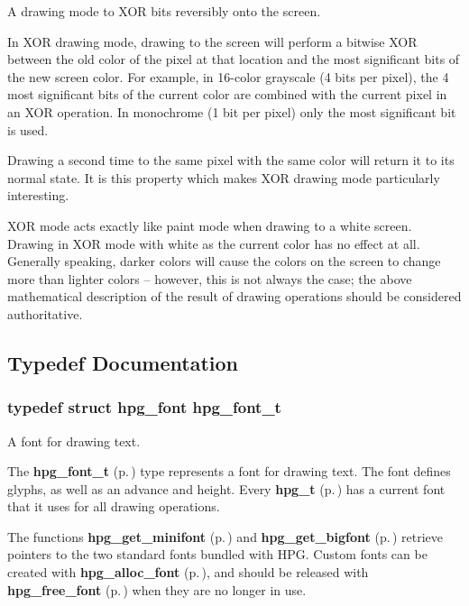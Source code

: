 A drawing mode to XOR bits reversibly onto the screen.

In XOR drawing mode, drawing to the screen will perform a bitwise XOR between the old color of the pixel at that location and the most significant bits of the new screen color. For example, in 16-color grayscale (4 bits per pixel), the 4 most significant bits of the current color are combined with the current pixel in an XOR operation. In monochrome (1 bit per pixel) only the most significant bit is used.

Drawing a second time to the same pixel with the same color will return it to its normal state. It is this property which makes XOR drawing mode particularly interesting.

XOR mode acts exactly like paint mode when drawing to a white screen. Drawing in XOR mode with white as the current color has no effect at all. Generally speaking, darker colors will cause the colors on the screen to change more than lighter colors -- however, this is not always the case; the above mathematical description of the result of drawing operations should be considered authoritative. 

\subsection{Typedef Documentation}
\subsubsection{\setlength{\rightskip}{0pt plus 5cm}typedef struct hpg\_\-font hpg\_\-font\_\-t}\label{hpgraphics_8h_a25}


A font for drawing text.

The {\bf hpg\_\-font\_\-t} {\rm (p.\,\pageref{hpgraphics_8h_a25})} type represents a font for drawing text. The font defines glyphs, as well as an advance and height. Every {\bf hpg\_\-t} {\rm (p.\,\pageref{hpgraphics_8h_a24})} has a current font that it uses for all drawing operations.

The functions {\bf hpg\_\-get\_\-minifont} {\rm (p.\,\pageref{hpgraphics_8h_a56})} and {\bf hpg\_\-get\_\-bigfont} {\rm (p.\,\pageref{hpgraphics_8h_a57})} retrieve pointers to the two standard fonts bundled with HPG. Custom fonts can be created with {\bf hpg\_\-alloc\_\-font} {\rm (p.\,\pageref{hpgraphics_8h_a72})}, and should be released with {\bf hpg\_\-free\_\-font} {\rm (p.\,\pageref{hpgraphics_8h_a73})} when they are no longer in use.

